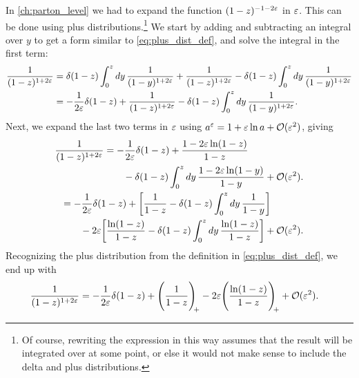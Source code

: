 In \cref{ch:parton_level} we had to expand the function $(1-z)^{-1-2\varepsilon}$ in $\varepsilon$. This can be done using plus distributions.\footnote{Of course, rewriting the expression in this way assumes that the result will be integrated over at some point, or else it would not make sense to include the delta and plus distributions.}
We start by adding and subtracting an integral over $y$ to get a form similar to \cref{eq:plus_dist_def}, and solve the integral in the first term:
\begin{align}
    \frac{1}{(1-z)^{1+2\varepsilon}}
    &= \delta(1-z) \int_0^z dy \, \frac{1}{(1-y)^{1+2\varepsilon}} + \frac{1}{(1-z)^{1+2\varepsilon}} - \delta(1-z) \int_0^z dy \, \frac{1}{(1-y)^{1+2\varepsilon}}
    \nonumber \\
    &= -\frac{1}{2\varepsilon} \delta(1-z) + \frac{1}{(1-z)^{1+2\varepsilon}} - \delta(1-z) \int_0^z dy \, \frac{1}{(1-y)^{1+2\varepsilon}}.
\end{align}
Next, we expand the last two terms in $\varepsilon$ using $a^\varepsilon = 1 + \varepsilon\ln a + \mathcal{O}(\varepsilon^2)$, giving
\begin{align}
    \begin{split}
        \frac{1}{(1-z)^{1+2\varepsilon}}
        &= -\frac{1}{2\varepsilon} \delta(1-z) + \frac{1 - 2\varepsilon\ln(1-z)}{1-z}
        \\ &\qquad
        - \delta(1-z) \int_0^z dy \, \frac{1 - 2\varepsilon\ln(1-y)}{1-y} + \mathcal{O}(\varepsilon^2).
    \end{split}
    \\
    \begin{split}
        &= -\frac{1}{2\varepsilon} \delta(1-z) + \biggl[ \frac{1}{1-z} - \delta(1-z) \int_0^z dy \, \frac{1}{1-y} \biggr]
        \\ &\qquad
        - 2\varepsilon \biggl[ \frac{\ln(1-z)}{1-z} - \delta(1-z) \int_0^z dy \, \frac{\ln(1-z)}{1-z} \biggr] + \mathcal{O}(\varepsilon^2).
    \end{split}
\end{align}
Recognizing the plus distribution from the definition in \cref{eq:plus_dist_def}, we end up with
\begin{align}
    \frac{1}{(1-z)^{1+2\varepsilon}}
    &= - \frac{1}{2\varepsilon} \delta(1-z)
    + \Biggl( \frac{1}{1-z} \Biggr)_{\!\!+} - 2\varepsilon \Biggl( \frac{\ln(1-z)}{1-z} \Biggr)_{\!\!+}
    + \mathcal{O}(\varepsilon^2).
    \label{eq:plus_dist_expansion}
\end{align}